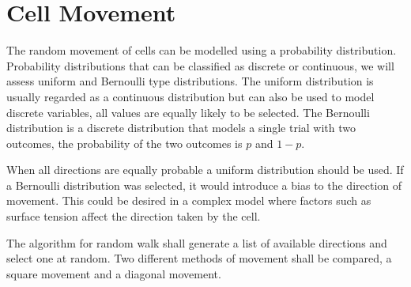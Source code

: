 \section{Cell Movement}


The random movement of cells can be modelled using a probability distribution.
Probability distributions that can be classified as discrete or continuous, we will assess uniform and Bernoulli type distributions.
The uniform distribution is usually regarded as a continuous distribution but can also be used to model discrete variables,
all values are equally likely to be selected.
The Bernoulli distribution is a discrete distribution that models a single trial with two outcomes,
the probability of the two outcomes is $p$ and $1-p$.







When all directions are equally probable a uniform distribution should be used.
If a Bernoulli distribution was selected, it would introduce a bias to the direction of movement.
This could be desired in a complex model where factors such as surface tension affect the direction taken by the cell.

The algorithm for random walk shall generate a list of available directions and select one at random.
Two different methods of movement shall be compared, a square movement and a diagonal movement.


